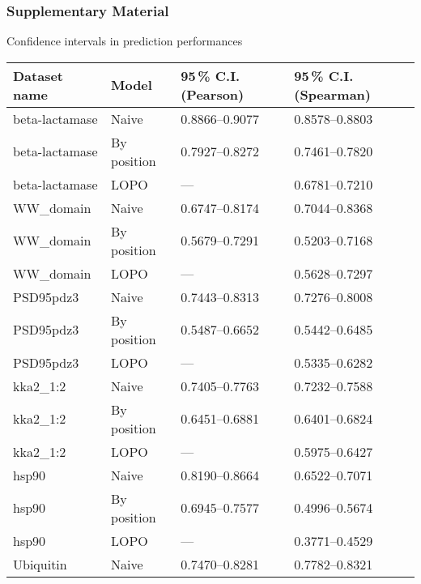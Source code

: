 \documentclass[10pt, british]{beamer}
\begin{document}
\begin{frame}
	\frametitle{Supplementary Material}
	Confidence intervals in prediction performances
	\vfill%
	\tiny%
	\begin{tabular*}{\linewidth}{@{\extracolsep{\fill}}llll}%
		\toprule
		Dataset name            & Model       & \num{95}\,\% C.I. (Pearson) & \num{95}\,\% C.I. (Spearman) \\
		\midrule
		beta-lactamase & Naive       & \numrange{0.8866}{0.9077}        & \numrange{0.8578}{0.8803}         \\
		beta-lactamase & By position & \numrange{0.7927}{0.8272}        & \numrange{0.7461}{0.7820}         \\
		beta-lactamase & LOPO        & ---                              & \numrange{0.6781}{0.7210}         \\
		WW\_domain     & Naive       & \numrange{0.6747}{0.8174}        & \numrange{0.7044}{0.8368}         \\
		WW\_domain     & By position & \numrange{0.5679}{0.7291}        & \numrange{0.5203}{0.7168}         \\
		WW\_domain     & LOPO        & ---                              & \numrange{0.5628}{0.7297}         \\
		PSD95pdz3      & Naive       & \numrange{0.7443}{0.8313}        & \numrange{0.7276}{0.8008}         \\
		PSD95pdz3      & By position & \numrange{0.5487}{0.6652}        & \numrange{0.5442}{0.6485}         \\
		PSD95pdz3      & LOPO        & ---                              & \numrange{0.5335}{0.6282}         \\
		kka2\_1:2      & Naive       & \numrange{0.7405}{0.7763}        & \numrange{0.7232}{0.7588}         \\
		kka2\_1:2      & By position & \numrange{0.6451}{0.6881}        & \numrange{0.6401}{0.6824}         \\
		kka2\_1:2      & LOPO        & ---                              & \numrange{0.5975}{0.6427}         \\
		hsp90          & Naive       & \numrange{0.8190}{0.8664}        & \numrange{0.6522}{0.7071}         \\
		hsp90          & By position & \numrange{0.6945}{0.7577}        & \numrange{0.4996}{0.5674}         \\
		hsp90          & LOPO        & ---                              & \numrange{0.3771}{0.4529}         \\
		Ubiquitin      & Naive       & \numrange{0.7470}{0.8281}        & \numrange{0.7782}{0.8321}         \\

\end{tabular*}
\end{frame}
\end{document}
